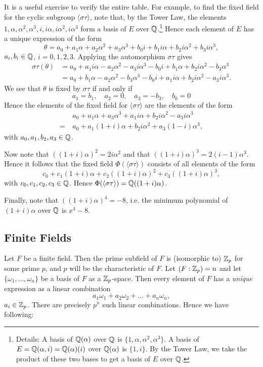 \begin{example}
	It is a useful exercise to verify the entire table. For example, to find the fixed field for the cyclic subgroup $\langle \sigma\tau \rangle$, note that, by the Tower Law, the elements $1, \alpha, \alpha^2, \alpha^3, i, i\alpha, i\alpha^2, i\alpha^3$ form a basis of $E$ over $\mathbb{Q}$.\footnote{Details: A basis of $\mathbb{Q}(\alpha)$ over $\mathbb{Q}$ is $\{1, \alpha, \alpha^2, \alpha^3\}$. A basis of $E = \mathbb{Q}(\alpha, i) = \mathbb{Q}(\alpha)(i)$ over $\mathbb{Q}(\alpha)$ is $\{1, i\}$. By the Tower Law, we take the product of these two bases to get a basis of $E$ over $\mathbb{Q}$.} Hence each element of $E$ has a unique expression of the form
	\[
		\theta = a_0 + a_1 \alpha + a_2 \alpha^2 + a_3 \alpha^3 + b_0 i + b_1 i\alpha + b_2 i\alpha^2 + b_3 i\alpha^3,
	\]
	$a_i, b_i \in \mathbb{Q}$, $i = 0, 1, 2, 3$. Applying the automorphism $\sigma\tau$ gives
	\begin{align*}
		\sigma\tau(\theta) &= a_0 + a_1 i\alpha - a_2 \alpha^2 - a_3 i\alpha^3 - b_0 i + b_1 \alpha + b_2 i\alpha^2 - b_3 \alpha^3 \\
			&= a_0 + b_1 \alpha - a_2 \alpha^2 - b_3 \alpha^3 - b_0 i + a_1 i\alpha + b_2 i\alpha^2 - a_3 i\alpha^3.
	\end{align*}
	We see that $\theta$ is fixed by $\sigma\tau$ if and only if
	\[
		a_1 = b_1, \quad a_2 = 0, \quad a_3 = -b_3, \quad b_0 = 0
	\]
	Hence the elements of the fixed field for $\langle \sigma\tau \rangle$ are the elements of the form
	\begin{align*}
		&a_0 + a_1 \alpha + a_3 \alpha^3 + a_1 i\alpha + b_2 i\alpha^2 - a_3 i\alpha^3 \\
		= \ & a_0 + a_1 (1 + i) \alpha + b_2 i\alpha^2 + a_3 (1 - i) \alpha^3,
	\end{align*}
	with $a_0, a_1, b_2, a_3 \in \mathbb{Q}$.
	
	Now note that $((1 + i)\alpha)^2 = 2i\alpha^2$ and that $((1 + i)\alpha)^3 = 2(i - 1)\alpha^3$. Hence it follows that the fixed field $\Phi(\langle \sigma\tau \rangle)$ consists of all elements of the form
	\[
		c_0 + c_1 (1 + i) \alpha + c_2 ((1 + i) \alpha)^2 + c_3 ((1 + i) \alpha)^3,
	\]
	with $c_0, c_1, c_2, c_3 \in \mathbb{Q}$. Hence $\Phi(\langle \sigma\tau \rangle) = \mathbb{Q}((1 + i)\alpha)$.
	
	Finally, note that $((1 + i) \alpha)^4 = -8$, i.e. the minimum polynomial of $(1 + i)\alpha$ over $\mathbb{Q}$ is $x^4 - 8$.
\end{example}

\subsection{Finite Fields}
Let $F$ be a finite field. Then the prime subfield of $F$ is (isomorphic to) $\mathbb{Z}_p$ for some prime $p$, and $p$ will be the characteristic of $F$. Let $(F : \mathbb{Z}_p) = n$ and let $\{\omega_1, \dots, \omega_n\}$ be a basis of $F$ as a $\mathbb{Z}_p$-space. Then every element of $F$ has a \emph{unique} expression as a linear combination
\[
	a_1 \omega_1 + a_2 \omega_2 + \dots + a_n \omega_n,
\]
$a_i \in \mathbb{Z}_p$. There are precisely $p^n$ such linear combinations. Hence we have following:

